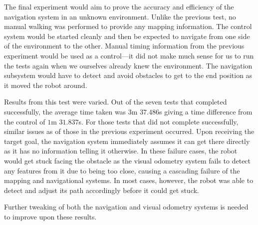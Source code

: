 The final experiment would aim to prove the accuracy and efficiency of the navigation system in an unknown environment. Unlike the previous test, no manual walking was performed to provide any mapping information. The control system would be started cleanly and then be expected to navigate from one side of the environment to the other. Manual timing information from the previous experiment would be used as a control---it did not make much sense for us to run the tests again when we ourselves already knew the environment. The navigation subsystem would have to detect and avoid obstacles to get to the end position as it moved the robot around. 

Results from this test were varied. Out of the seven tests that completed successfully, the average time taken was $3$m $37.486$s giving a time difference from the control of $1$m $31.837$s. For those tests that did not complete successfully, similar issues as of those in the previous experiment occurred. Upon receiving the target goal, the navigation system immediately assumes it can get there directly as it has no information telling it otherwise. In these failure cases, the robot would get stuck facing the obstacle as the visual odometry system fails to detect any features from it due to being too close, causing a cascading failure of the mapping and navigational systems. In most cases, however, the robot was able to detect and adjust its path accordingly before it could get stuck. 

Further tweaking of both the navigation and visual odometry systems is needed to improve upon these results.